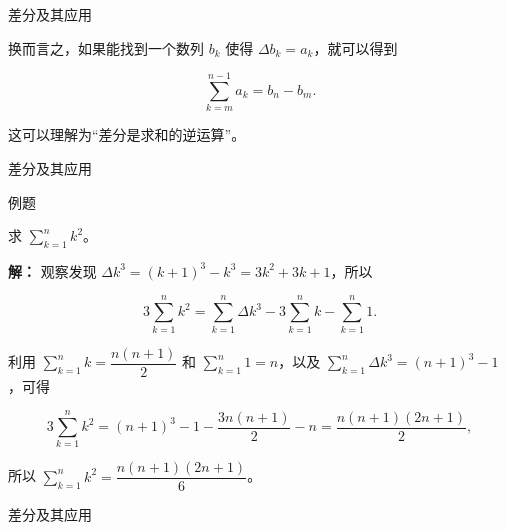 \documentclass[aspectratio=169,10pt,fontset=fandol]{ctexbeamer}
\begin{document}
\begin{frame}[t,fragile]{差分及其应用}
\normalsize
{\normalsize




换而言之，如果能找到一个数列 \(b_k\) 使得 \(\Delta b_k=a_k\)，就可以得到

\[

\sum_{k=m}^{n-1}a_k=b_n-b_m.

\]

这可以理解为“差分是求和的逆运算”。




}
\end{frame}
\begin{frame}[t,fragile]{差分及其应用}
\normalsize
\begin{block}{例题}
{\normalsize


求 \(\sum_{k=1}^n k^2\)。


}
\end{block}
\pause
{\normalsize
\textbf{解：}
观察发现 \(\Delta k^3 = (k+1)^3 - k^3 = 3k^2 + 3k + 1\)，所以

\[

3\sum_{k=1}^n k^2 = \sum_{k=1}^n \Delta k^3 - 3\sum_{k=1}^n k - \sum_{k=1}^n 1.

\]

利用 \(\sum_{k=1}^n  k = \dfrac{n(n+1)}{2}\) 和 \(\sum_{k=1}^n  1 = n\)，以及 \(\sum_{k=1}^n  \Delta k^3 = (n+1)^3 - 1\)，可得

\[

3\sum_{k=1}^n  k^2 = (n+1)^3 - 1 - \dfrac{3n(n+1)}{2} - n = \dfrac{n(n+1)(2n+1)}{2},

\]

所以 \(\sum_{k=1}^n k^2 = \dfrac{n(n+1)(2n+1)}{6}\)。


}
\end{frame}
\begin{frame}[t,fragile]{差分及其应用}
\normalsize
{\normalsize






\iffalse


}
\end{frame}
\end{document}
